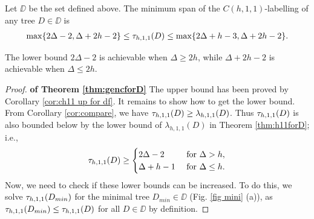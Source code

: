 \begin{theorem}
\label{thm:gencforD}
Let $\DD$ be the set defined above. The minimum span of the $C(h,1,1)$-labelling of any tree $D \in \DD$ is 
\begin{align*}
\max\{2\Delta-2, \Delta+2h-2\} \le \tau_{h,1,1}(D) \le 
 \max\{2\Delta+h-3, \Delta+2h-2\}.
\end{align*}
\end{theorem}

The lower bound $2\Delta-2$ is achievable when $\Delta \ge 2h$, while $\Delta+2h-2$ is achievable when $\Delta \le 2h$. 

\begin{proof} {\bf of Theorem \ref{thm:gencforD}}
The upper bound has been proved by Corollary \ref{cor:ch11 up for df}. It remains to show how to get the lower bound. From Corollary \ref{cor:compare}, we have $\tau_{h,1,1}(D) \ge \lambda_{h,1,1}(D)$. Thus $\tau_{h,1,1}(D)$ is also bounded below by the lower bound of $\lambda_{h,1,1}(D)$ in Theorem \ref{thm:h11forD}; i.e.,  
\begin{align*}
\tau_{h,1,1}(D) \ge 
 \begin{cases}
 2\Delta-2 & \text{ for } \Delta > h, \\
 \Delta +h-1 & \text{ for } \Delta \le h.
 \end{cases}
\end{align*}
Now, we need to check if these lower bounds can be increased. To do this, we solve $\tau_{h,1,1}(D_{min})$ for the minimal tree $D_{min} \in \DD$ (Fig. \ref{fig mini} (a)), as $\tau_{h,1,1}(D_{min}) \le \tau_{h,1,1}(D)$ for all $D \in \DD$ by definition.


\end{proof}
